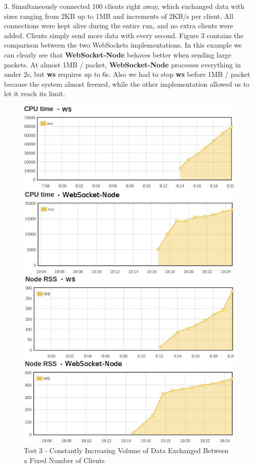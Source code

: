 \documentclass[conference]{IEEEtran}
\begin{document}
3. Simultaneously connected 100 clients right away, which exchanged data with
sizes ranging from 2KB up to 1MB and increments of 2KB/s per client. All
connections were kept alive during the entire run, and no extra clients were
added. Clients simply send more data with every second. Figure 3 contains
the comparison between the two WebSockets implementations. In this example
we can clearly see that \textbf{WebSocket-Node} behaves better when
sending large packets. At almost 1MB / packet, \textbf{WebSocket-Node}
processes everything in under 2s, but \textbf{ws} requires up to 6s. Also
we had to stop \textbf{ws} before 1MB / packet because the system almost
freezed, while the other implementation allowed us to let it reach its limit.
\begin{frame}{}
  \begin{figure}
    \centering
	\includegraphics[width=1\linewidth]{img/test3v2.png}
    \caption{Test 3 - Constantly Increasing Volume of Data Exchanged Between a
	         Fixed Number of Clients}
  \end{figure}
\end{frame}
\\
\end{document}
